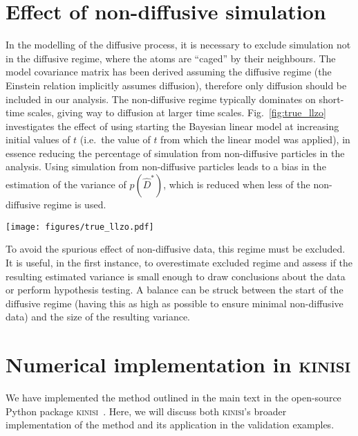 \documentclass[reprint,superscriptaddress,nobibnotes,amsmath,amssymb,aps,prx,hidelinks]{revtex4-2}
\newcommand{\prob}[1]{\ensuremath{p(#1)}}
\newcommand{\Dest}{\ensuremath{\widehat{D}^*}}
\newcommand{\varest}[1]{\ensuremath{\widehat{\sigma}^2[#1]}}
\begin{document}
\section{Effect of non-diffusive simulation}
\label{sec:nondiff}
%
In the modelling of the diffusive process, it is necessary to exclude simulation not in the diffusive regime, where the atoms are ``caged'' by their neighbours. 
The model covariance matrix has been derived assuming the diffusive regime (the Einstein relation implicitly assumes diffusion), therefore only diffusion should be included in our analysis. 
The non-diffusive regime typically dominates on short-time scales, giving way to diffusion at larger time scales. 
Fig.~\ref{fig:true_llzo} investigates the effect of using starting the Bayesian linear model at increasing initial values of $t$ (i.e.\ the value of $t$ from which the linear model was applied), in essence reducing the percentage of simulation from non-diffusive particles in the analysis. 
Using simulation from non-diffusive particles leads to a bias in the estimation of the variance of $\prob{\Dest}$, which is reduced when less of the non-diffusive regime is used. 
%
\begin{figure*}
    \centering
    \texttt{[image: figures/true\_llzo.pdf]}
    \caption{
        A comparison of the effect of different starting times for the diffusive regime \SIlist[list-final-separator = {, and }]{0;2;4;6;8;10;15;20}{\pico\second} of the LLZO systems on $\varest{\Dest}$.
        }
    \label{fig:true_llzo}
\end{figure*}
%

To avoid the spurious effect of non-diffusive data, this regime must be excluded. 
It is useful, in the first instance, to overestimate excluded regime and assess if the resulting estimated variance is small enough to draw conclusions about the data or perform hypothesis testing.  
A balance can be struck between the start of the diffusive regime (having this as high as possible to ensure minimal non-diffusive data) and the size of the resulting variance. 

\section{Numerical implementation in \textsc{kinisi}}
\label{sec:implementation}
%
We have implemented the method outlined in the main text in the open-source Python package \textsc{kinisi}~\cite{mccluskey_kinisi_2022}. 
Here, we will discuss both \textsc{kinisi}'s broader implementation of the method and its application in the validation examples. 
\end{document}
